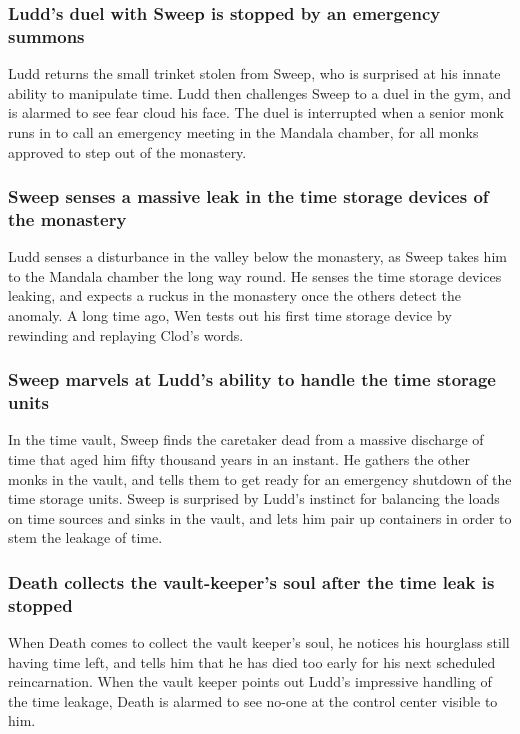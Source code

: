 \subsubsection{\Gls{Ludd}'s duel with \Gls{Sweep} is stopped by an emergency summons}
\Gls{Ludd} returns the small trinket stolen from \Gls{Sweep}, who is surprised at his innate ability
to manipulate time. \Gls{Ludd} then challenges \Gls{Sweep} to a duel in the gym, and is alarmed to
see fear cloud his face. The duel is interrupted when a senior monk runs in to call an emergency
meeting in the Mandala chamber, for all monks approved to step out of the monastery.

\subsubsection{\Gls{Sweep} senses a massive leak in the time storage devices of the monastery}
\Gls{Ludd} senses a disturbance in the valley below the monastery, as \Gls{Sweep} takes him to the
Mandala chamber the long way round. He senses the time storage devices leaking, and expects a
ruckus in the monastery once the others detect the anomaly. A long time ago, \Gls{Wen} tests out
his first time storage device by rewinding and replaying \Gls{Clod}'s words.

\subsubsection{\Gls{Sweep} marvels at \Gls{Ludd}'s ability to handle the time storage units}
In the time vault, \Gls{Sweep} finds the caretaker dead from a massive discharge of time that aged
him fifty thousand years in an instant. He gathers the other monks in the vault, and tells them to
get ready for an emergency shutdown of the time storage units. \Gls{Sweep} is surprised by
\Gls{Ludd}'s instinct for balancing the loads on time sources and sinks in the vault, and lets him
pair up containers in order to stem the leakage of time.

\subsubsection{\Gls{Death} collects the vault-keeper's soul after the time leak is stopped}
When \Gls{Death} comes to collect the vault keeper's soul, he notices his hourglass still having
time left, and tells him that he has died too early for his next scheduled reincarnation. When
the vault keeper points out \Gls{Ludd}'s impressive handling of the time leakage, \Gls{Death} is
alarmed to see no-one at the control center visible to him.

